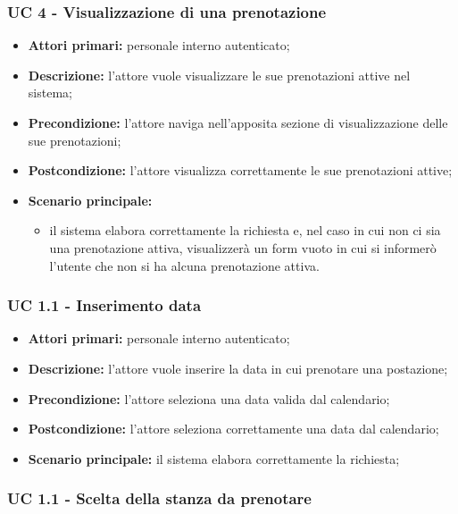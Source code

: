 \subsubsection{UC 4 - Visualizzazione di una prenotazione}

\begin{itemize}
\item \textbf{Attori primari:} personale interno autenticato;
\item \textbf{Descrizione:} l'attore vuole visualizzare le sue prenotazioni attive nel sistema;
\item \textbf{Precondizione:} l'attore naviga nell’apposita sezione di visualizzazione delle sue prenotazioni;
\item \textbf{Postcondizione:} l'attore visualizza correttamente le sue prenotazioni attive;
\item \textbf{Scenario principale:} 
	\begin{itemize}
		\item il sistema elabora correttamente la richiesta e, nel caso in cui non ci sia una prenotazione attiva, visualizzerà un form vuoto in cui si informerò l'utente che non si ha alcuna prenotazione attiva.
	\end{itemize}
\end{itemize}

\subsubsection{UC 1.1 - Inserimento data}

\begin{itemize}
\item \textbf{Attori primari:} personale interno autenticato;
\item \textbf{Descrizione:} l'attore vuole inserire la data in cui prenotare una postazione;
\item \textbf{Precondizione:} l'attore seleziona una data valida dal calendario;
\item \textbf{Postcondizione:} l'attore seleziona correttamente una data dal calendario;
\item \textbf{Scenario principale:} il sistema elabora correttamente la richiesta;
\end{itemize}

\subsubsection{UC 1.1 - Scelta della stanza da prenotare}

